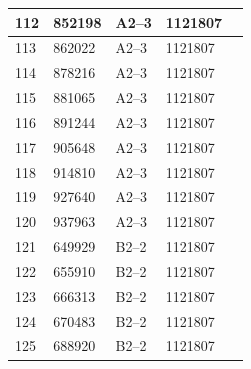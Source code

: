 \documentclass[UTF8,10pt,a4paper,fontset=fandol]{ctexart}
\begin{document}
\begin{tabular}{|p{0.65cm}|p{1.65cm}|p{3.05cm}|p{2.15cm}|p{2.85cm}|}
\hline
112 & 852198 & A2--3 & 1121807 & \\
\hline
113 & 862022 & A2--3 & 1121807 & \\
\hline
114 & 878216 & A2--3 & 1121807 & \\
\hline
115 & 881065 & A2--3 & 1121807 & \\
\hline
116 & 891244 & A2--3 & 1121807 & \\
\hline
117 & 905648 & A2--3 & 1121807 & \\
\hline
118 & 914810 & A2--3 & 1121807 & \\
\hline
119 & 927640 & A2--3 & 1121807 & \\
\hline
120 & 937963 & A2--3 & 1121807 & \\
\hline
121 & 649929 & B2--2 & 1121807 & \\
\hline
122 & 655910 & B2--2 & 1121807 & \\
\hline
123 & 666313 & B2--2 & 1121807 & \\
\hline
124 & 670483 & B2--2 & 1121807 & \\
\hline
125 & 688920 & B2--2 & 1121807 & \\
\hline
\end{tabular}

\normalsize


\newpage
\end{document}

